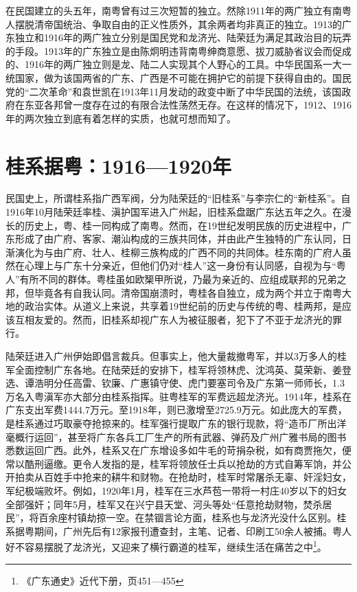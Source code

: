 在民国建立的头五年，南粤曾有过三次短暂的独立。然除1911年的两广独立有南粤人摆脱清帝国统治、争取自由的正义性质外，其余两者均非真正的独立。1913的广东独立和1916年的两广独立分别是国民党和龙济光、陆荣廷为满足其政治目的玩弄的手段。1913年的广东独立是由陈炯明违背南粤绅商意愿、拔刀威胁省议会而促成的、1916年的两广独立则是龙、陆二人实现其个人野心的工具。中华民国系一大一统国家，做为该国两省的广东、广西是不可能在拥护它的前提下获得自由的。国民党的“二次革命”和袁世凯在1913年11月发动的政变中断了中华民国的法统，该国政府在东亚各邦曾一度存在过的有限合法性荡然无存。在这样的情况下，1912、1916年的两次独立到底有着怎样的实质，也就可想而知了。

\section{桂系据粤：1916—1920年}

民国史上，所谓桂系指广西军阀，分为陆荣廷的“旧桂系”与李宗仁的“新桂系”。自1916年10月陆荣廷率桂、滇护国军进入广州起，旧桂系盘踞广东达五年之久。在漫长的历史上，粤、桂一同构成了南粤。然而，在19世纪发明民族的历史进程中，广东形成了由广府、客家、潮汕构成的三族共同体，并由此产生独特的广东认同，日渐演化为与由广府、壮人、桂柳三族构成的广西不同的共同体。桂东南的广府人虽然在心理上与广东十分亲近，但他们仍对“桂人”这一身份有认同感，自视为与“粤人”有所不同的群体。粤桂虽如欧榘甲所说，乃最为亲近的、应组成联邦的兄弟之邦，但毕竟各有自我认同。清帝国崩溃时，粤桂各自独立，成为两个并立于南粤大地的政治实体。从道义上来说，共享着19世纪前的历史与传统的粤、桂两邦，是应该互相友爱的。然而，旧桂系却视广东人为被征服者，犯下了不亚于龙济光的罪行。

陆荣廷进入广州伊始即倡言裁兵。但事实上，他大量裁撤粤军，并以3万多人的桂军全面控制广东各地。在陆荣廷的安排下，桂军将领林虎、沈鸿英、莫荣新、姜登选、谭浩明分任高雷、钦廉、广惠镇守使、虎门要塞司令及广东第一师师长，1.3万名入粤滇军亦大部分由桂系指挥。驻粤桂军的军费远超龙济光。1914年，桂系在广东支出军费1444.7万元。至1918年，则已激增至2725.9万元。如此庞大的军费，是桂系通过巧取豪夺抢掠来的。桂军强行提取广东的银行现款，将“造币厂所出洋毫概行运回”，甚至将广东各兵工厂生产的所有武器、弹药及广州广雅书局的图书悉数运回广西。此外，桂系又在广东增设多如牛毛的苛捐杂税，如有商贾拖欠，便常以酷刑逼缴。更令人发指的是，桂军将领放任士兵以抢劫的方式自筹军饷，并公开拍卖从百姓手中抢来的耕牛和财物。在抢劫时，桂军时常屠杀无辜、奸淫妇女，军纪极端败坏。例如，1920年1月，桂军在三水芦苞一带将一村庄40岁以下的妇女全部强奸；同年5月，桂军又在兴宁县天堂、河头等处“任意抢劫财物，焚杀居民”，将百余座村镇劫掠一空。在禁锢言论方面，桂系也与龙济光没什么区别。桂系据粤期间，广州先后有12家报刊遭查封，主笔、记者、印刷工50余人被捕。粤人好不容易摆脱了龙济光，又迎来了横行霸道的桂军，继续生活在痛苦之中\footnote{《广东通史》近代下册，页451—455}。


